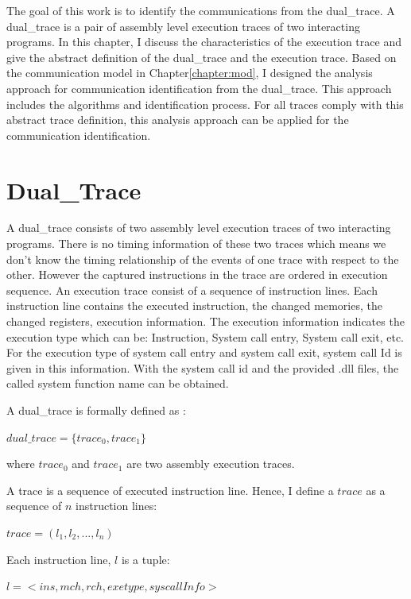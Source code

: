 


\label{chapter:alo}
The goal of this work is to identify the communications from the dual\_trace. A dual\_trace is a pair of assembly level execution traces of two interacting programs. In this chapter, I discuss the characteristics of the execution trace and give the abstract definition of the dual\_trace and the execution trace. Based on the communication model in Chapter\ref{chapter:mod}, I designed the analysis approach for communication identification from the dual\_trace. This approach includes the algorithms and identification process.  For all traces comply with this abstract trace definition, this analysis approach can be applied for the communication identification.

\section{Dual\_Trace}
A dual\_trace consists of two assembly level execution traces of two interacting programs. There is no timing information of these two traces which means we don't know the timing relationship of the events of one trace with respect to the other. However the captured instructions in the trace are ordered in execution sequence. An execution trace consist of a sequence of instruction lines. Each instruction line contains the executed instruction, the changed memories, the changed registers, execution information. The execution information indicates the execution type which can be: Instruction, System call entry, System call exit, etc. For the execution type of system call entry and system call exit, system call Id is given in this information. With the system call id and the provided .dll files, the called system function name can be obtained. 

A dual\_trace is formally defined as :

$dual\_trace = \lbrace trace_0, trace_1\rbrace$

where $trace_0$ and $trace_1$ are two assembly execution traces.

A trace is a sequence of executed instruction line. Hence, I define a $trace$ as a sequence of $n$ instruction lines:

$ trace = (l_1, l_2, ..., l_n)$ 

Each instruction line, $l$ is a tuple:

$l = <ins, mch, rch, exetype, syscallInfo>$

